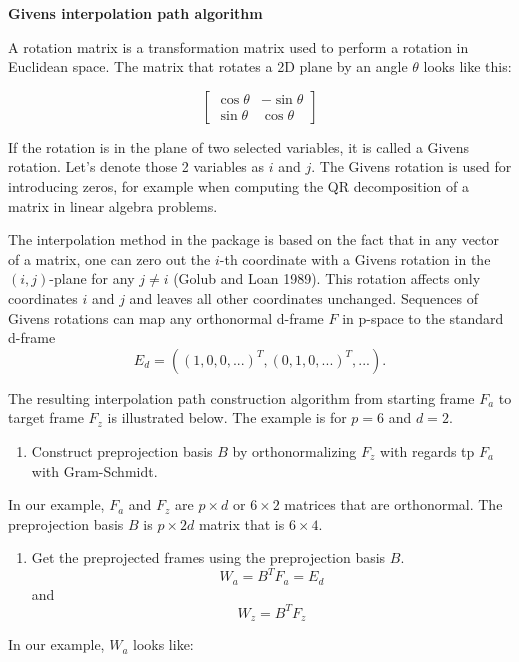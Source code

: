 \textbf{Givens interpolation path algorithm}

A rotation matrix is a transformation matrix used to perform a rotation in Euclidean space. The matrix that rotates a 2D plane by an angle \(\theta\) looks like this:

\[ \begin{bmatrix}\cos \theta &-\sin \theta \\\sin \theta &\cos \theta \end{bmatrix} \]

If the rotation is in the plane of two selected variables, it is called a Givens rotation. Let's denote those 2 variables as \(i\) and \(j\). The Givens rotation is used for introducing zeros, for example when computing the QR decomposition of a matrix in linear algebra problems.

The interpolation method in the  package is based on the fact that in any vector of a matrix, one can zero out the \(i\)-th coordinate with a Givens rotation in the \((i, j)\)-plane for any \(j\neq i\) (Golub and Loan 1989). This rotation affects only coordinates \(i\) and \(j\) and leaves all other coordinates unchanged.
Sequences of Givens rotations can map any orthonormal d-frame \(F\) in p-space to the standard d-frame
\[E_d=((1, 0, 0, ...)^T, (0, 1, 0, ...)^T, ...).\]

The resulting interpolation path construction algorithm from starting frame \(F_a\) to target frame \(F_z\) is illustrated below. The example is for \(p=6\) and \(d=2\).

\begin{enumerate}
\def\labelenumi{\arabic{enumi}.}
\tightlist
\item
  Construct preprojection basis \(B\) by orthonormalizing \(F_z\) with regards tp \(F_a\) with Gram-Schmidt.
\end{enumerate}

In our example, \(F_a\) and \(F_z\) are \(p\times d\) or \(6\times2\) matrices that are orthonormal. The preprojection basis \(B\) is \(p\times 2d\) matrix that is \(6\times 4\).

\begin{enumerate}
\def\labelenumi{\arabic{enumi}.}
\setcounter{enumi}{1}
\tightlist
\item
  Get the preprojected frames using the preprojection basis \(B\).
  \[W_a = B^TF_a = E_d\] and \[W_z = B^TF_z\]
\end{enumerate}

In our example, \(W_a\) looks like:

